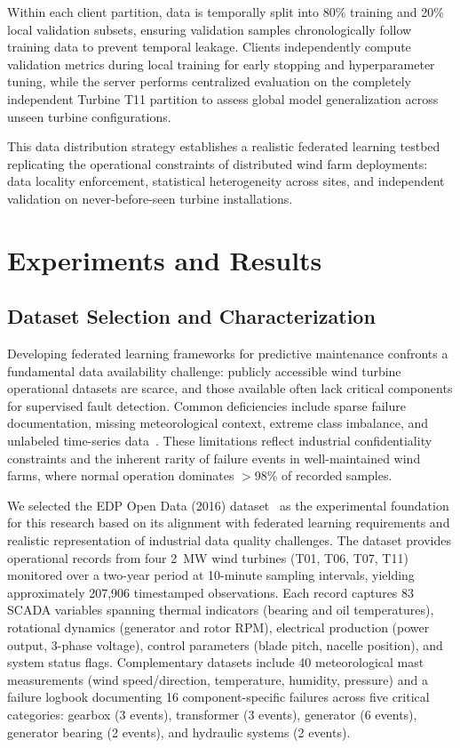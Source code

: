\documentclass[12pt]{article}
\begin{document}
Within each client partition, data is temporally split into 80\% training and 20\% local validation subsets, ensuring validation samples chronologically follow training data to prevent temporal leakage. Clients independently compute validation metrics during local training for early stopping and hyperparameter tuning, while the server performs centralized evaluation on the completely independent Turbine T11 partition to assess global model generalization across unseen turbine configurations.

This data distribution strategy establishes a realistic federated learning testbed replicating the operational constraints of distributed wind farm deployments: data locality enforcement, statistical heterogeneity across sites, and independent validation on never-before-seen turbine installations.
\section{Experiments and Results}
\subsection{Dataset Selection and Characterization}
\label{subsec:dataset_selection}

Developing federated learning frameworks for predictive maintenance confronts a fundamental data availability challenge: publicly accessible wind turbine operational datasets are scarce, and those available often lack critical components for supervised fault detection. Common deficiencies include sparse failure documentation, missing meteorological context, extreme class imbalance, and unlabeled time-series data~\cite{maldonado_correa_scada_2020}. These limitations reflect industrial confidentiality constraints and the inherent rarity of failure events in well-maintained wind farms, where normal operation dominates $>$98\% of recorded samples.

We selected the EDP Open Data (2016) dataset~\cite{edp_open_data_2018} as the experimental foundation for this research based on its alignment with federated learning requirements and realistic representation of industrial data quality challenges. The dataset provides operational records from four 2~MW wind turbines (T01, T06, T07, T11) monitored over a two-year period at 10-minute sampling intervals, yielding approximately 207,906 timestamped observations. Each record captures 83 SCADA variables spanning thermal indicators (bearing and oil temperatures), rotational dynamics (generator and rotor RPM), electrical production (power output, 3-phase voltage), control parameters (blade pitch, nacelle position), and system status flags. Complementary datasets include 40 meteorological mast measurements (wind speed/direction, temperature, humidity, pressure) and a failure logbook documenting 16 component-specific failures across five critical categories: gearbox (3 events), transformer (3 events), generator (6 events), generator bearing (2 events), and hydraulic systems (2 events).
\end{document}
